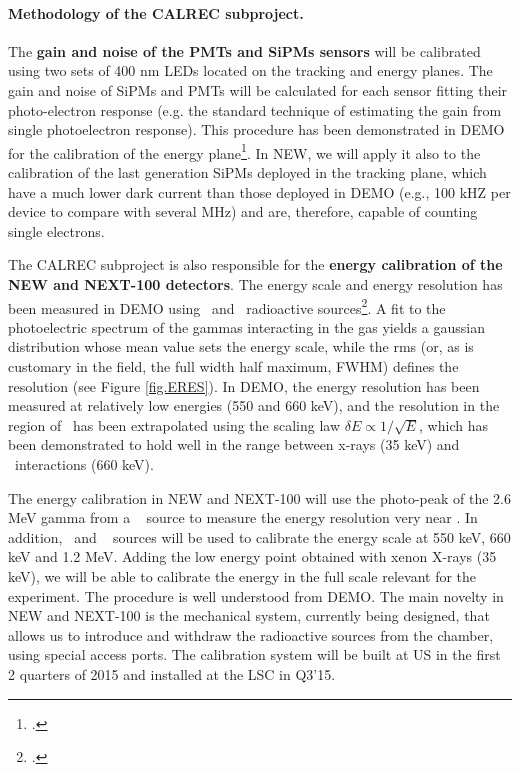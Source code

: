 \paragraph{Methodology of the CALREC subproject.}

The {\bf gain and noise of the PMTs and SiPMs sensors} will be calibrated using two sets of 400 nm LEDs located on the tracking and energy planes. The gain and noise of SiPMs and PMTs will be calculated for each sensor fitting their photo-electron response (e.g. the standard technique of estimating the gain from single photoelectron response). This procedure has been demonstrated in DEMO for the calibration of the energy plane\footcite{Lorca:2014sra}. In NEW, we will apply it also to the calibration of the last generation SiPMs deployed in the tracking plane, which have a much lower dark current than those deployed in DEMO (e.g., 100 kHZ per device to compare with several MHz) and are, therefore, capable of counting single electrons.

The CALREC subproject is also responsible for the {\bf energy calibration of the NEW and NEXT-100 detectors}. The energy scale and energy resolution has been measured in DEMO using \NA\ and \CS\ radioactive sources\footcite{Alvarez:2012nd,Alvarez:2013gxa}. A fit to the photoelectric spectrum of the gammas interacting in the gas yields a gaussian distribution whose mean value sets the energy scale, while the rms (or, as is customary in the field, the full width half maximum, FWHM) defines the resolution (see Figure \ref{fig.ERES}). In DEMO, the energy resolution has been measured at relatively low energies (550 and 660 keV), and the resolution in the region of \Qbb\ has been extrapolated using the scaling law $\delta E \propto 1/\sqrt{E}$, which has been demonstrated to hold well in the range between x-rays (35 keV) and \CS\ interactions (660 keV). 

The energy calibration in NEW and NEXT-100 will use the photo-peak of the 2.6 MeV gamma from a \Tl~  source to measure the energy resolution very near \Qbb. In addition, \NA\ and \CS~ sources will be used to calibrate the energy scale at  550 keV, 660 keV and 1.2 MeV. Adding the low energy point obtained with xenon X-rays (35 keV), we will be able to calibrate the energy in the full scale relevant for the experiment. The procedure is well understood from DEMO. The main novelty in NEW and NEXT-100 is the mechanical system, currently being designed, that allows us to introduce and withdraw the radioactive sources from the chamber, using special access ports. The calibration system will be built at US in the first 2 quarters of 2015 and installed at the LSC in Q3'15.

